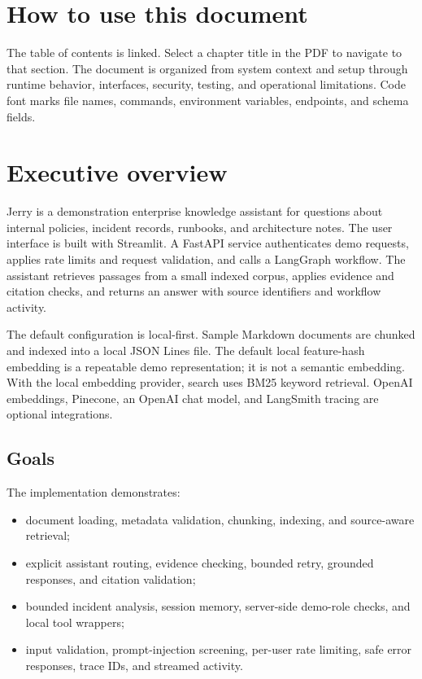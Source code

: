 \documentclass[11pt,a4paper,oneside]{report}
\begin{document}
\chapter*{How to use this document}
The table of contents is linked. Select a chapter title in the PDF to navigate to that section. The document is organized from system context and setup through runtime behavior, interfaces, security, testing, and operational limitations. Code font marks file names, commands, environment variables, endpoints, and schema fields.

\tableofcontents
\clearpage
{}

\chapter{Executive overview}

Jerry is a demonstration enterprise knowledge assistant for questions about internal policies, incident records, runbooks, and architecture notes. The user interface is built with Streamlit. A FastAPI service authenticates demo requests, applies rate limits and request validation, and calls a LangGraph workflow. The assistant retrieves passages from a small indexed corpus, applies evidence and citation checks, and returns an answer with source identifiers and workflow activity.

The default configuration is local-first. Sample Markdown documents are chunked and indexed into a local JSON Lines file. The default local feature-hash embedding is a repeatable demo representation; it is not a semantic embedding. With the local embedding provider, search uses BM25 keyword retrieval. OpenAI embeddings, Pinecone, an OpenAI chat model, and LangSmith tracing are optional integrations.

\section{Goals}
The implementation demonstrates:
\begin{itemize}
  \item document loading, metadata validation, chunking, indexing, and source-aware retrieval;
  \item explicit assistant routing, evidence checking, bounded retry, grounded responses, and citation validation;
  \item bounded incident analysis, session memory, server-side demo-role checks, and local tool wrappers;
  \item input validation, prompt-injection screening, per-user rate limiting, safe error responses, trace IDs, and streamed activity.
\end{itemize}
\end{document}
